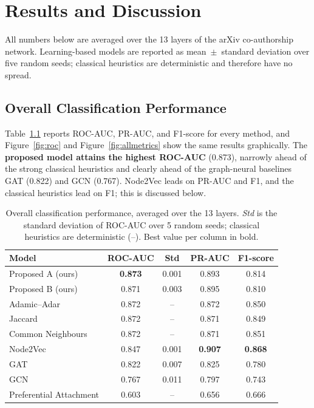\chapter{Results and Discussion}
\label{ch:results}

All numbers below are averaged over the 13 layers of the arXiv co-authorship network. Learning-based
models are reported as mean~$\pm$~standard deviation over five random seeds; classical heuristics are
deterministic and therefore have no spread.

\section{Overall Classification Performance}
Table~\ref{tab:overall} reports ROC-AUC, PR-AUC, and F1-score for every method, and
Figure~\ref{fig:roc} and Figure~\ref{fig:allmetrics} show the same results graphically. The
\textbf{proposed model attains the highest ROC-AUC} (0.873), narrowly ahead of the strong classical
heuristics and clearly ahead of the graph-neural baselines GAT (0.822) and GCN (0.767). Node2Vec
leads on PR-AUC and F1, and the classical heuristics lead on F1; this is discussed below.

\begin{table}[htbp]
\centering
\caption{Overall classification performance, averaged over the 13 layers. \emph{Std} is the standard
deviation of ROC-AUC over 5 random seeds; classical heuristics are deterministic (--). Best value per
column in bold.}
\label{tab:overall}
\renewcommand{\arraystretch}{1.25}
\begin{tabular}{lcccc}
\toprule
\textbf{Model} & \textbf{ROC-AUC} & \textbf{Std} & \textbf{PR-AUC} & \textbf{F1-score} \\
\midrule
Proposed A (ours)       & \textbf{0.873} & 0.001 & 0.893 & 0.814 \\
Proposed B (ours)       & 0.871 & 0.003 & 0.895 & 0.810 \\
Adamic--Adar            & 0.872 & --    & 0.872 & 0.850 \\
Jaccard                 & 0.872 & --    & 0.871 & 0.849 \\
Common Neighbours       & 0.872 & --    & 0.871 & 0.851 \\
Node2Vec                & 0.847 & 0.001 & \textbf{0.907} & \textbf{0.868} \\
GAT                     & 0.822 & 0.007 & 0.825 & 0.780 \\
GCN                     & 0.767 & 0.011 & 0.797 & 0.743 \\
Preferential Attachment & 0.603 & --    & 0.656 & 0.666 \\
\bottomrule
\end{tabular}
\end{table}


